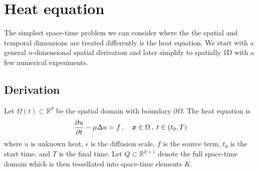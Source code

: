 \documentclass[Proposal.tex]{subfiles}
\begin{document}
%                                          
%                                          
%  
\section{Heat equation}
The simplest space-time problem we can consider where the the spatial and temporal dimensions are treated differently is the heat equation.
We start with a general $n$-dimensional spatial derivation and later simplify to spatially 1D with a few numerical experiments.

\subsection{Derivation}
Let $\Omega(t)\subset\mathbb{R}^d$ be the spatial domain with boundary $\partial\Omega$.
The heat equation is
\begin{equation}
	\frac{\partial u}{\partial t}-\mu\Delta u=f\,,\quad\boldsymbol x\in\Omega\,,\;t\in(t_0,T)
\end{equation}
where $u$ is unknown heat, $\epsilon$ is the diffusion scale, $f$ is the source term, $t_0$ is the start time, and $T$ is the final time.
Let $Q\subset\mathbb{R}^{d+1}$ denote the full space-time domain which is then tessellated into space-time elements $K$.
\end{document}
